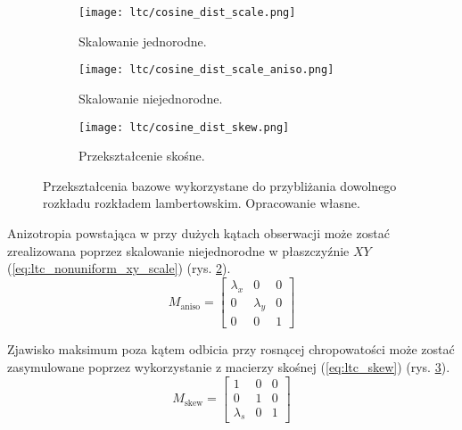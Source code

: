 \documentclass[../main.tex]{subfiles}
\begin{document}
\begin{figure}[h]
\centering
    \begin{subfigure}[t]{0.25\textwidth}
        \texttt{[image: ltc/cosine\_dist\_scale.png]}
        \caption{Skalowanie jednorodne.}
        \label{fig:LTCEqualScale}
    \end{subfigure}
    \hspace{0.03\textwidth}
    \begin{subfigure}[t]{0.25\textwidth}
        \centering
        \texttt{[image: ltc/cosine\_dist\_scale\_aniso.png]}
        \caption{Skalowanie niejednorodne.}
        \label{fig:LTCAnisoScale}
    \end{subfigure}
    \hspace{0.03\textwidth}
    \begin{subfigure}[t]{0.25\textwidth}
        \centering
        \texttt{[image: ltc/cosine\_dist\_skew.png]}
        \caption{Przekształcenie skośne.}
        \label{fig:LTCSkew}
    \end{subfigure}
    \caption{Przekształcenia bazowe wykorzystane do przybliżania dowolnego rozkładu rozkładem lambertowskim. Opracowanie własne.}
    \label{fig:LTCTransforms}
\end{figure}

Anizotropia powstająca w przy dużych kątach obserwacji może zostać zrealizowana poprzez skalowanie niejednorodne w płaszczyźnie $XY$ (\ref{eq:ltc_nonuniform_xy_scale}) (rys. \ref{fig:LTCAnisoScale}).
\begin{equation}
M_{\text{aniso}} =
\begin{bmatrix}
  \lambda_x & 0 & 0 \\
  0 & \lambda_y & 0 \\
  0 & 0 & 1
\end{bmatrix}
\label{eq:ltc_nonuniform_xy_scale}
\end{equation}

Zjawisko maksimum poza kątem odbicia przy rosnącej chropowatości może zostać zasymulowane poprzez wykorzystanie z macierzy skośnej (\ref{eq:ltc_skew}) (rys. \ref{fig:LTCSkew}).
\begin{equation}
M_{\text{skew}} =
\begin{bmatrix}
  1 & 0 & 0 \\
  0 & 1 & 0 \\
  \lambda_{s} & 0 & 1
\end{bmatrix}
\label{eq:ltc_skew}
\end{equation}
\end{document}
